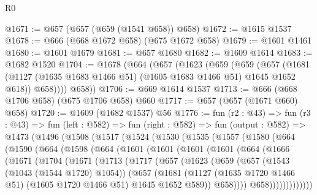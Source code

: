 \begin{lexlean}{R0}
\begin{coremodule}
@1671 := @657 (@657 (@659 (@1541 @658)) @658)
@1672 := @1615 @1537
@1678 := @666 (@668 @1672 @658) (@675 @1672 @658)
@1679 := @1601 @1461
@1680 := @1601 @1679
@1681 := @657 @1680
@1682 := @1609 @1614
@1683 := @1682 @1520
@1704 := @1678
    (@664
      (@657
        (@1623
          (@659
            (@659
              (@657
                (@1681 (@1127 (@1635 @1683 @1466 @51) (@1605 @1683 @1466 @51) @1645 @1652 @618))
                @658))))
        @658))
@1706 := @669 @1614 @1537
@1713 := @666 (@668 @1706 @658) (@675 @1706 @658) @660
@1717 := @657 (@657 (@1671 @660) @658)
@1720 := @1609 (@1682 @1537) @56
@1776 := fun (r2 : @43) =>
  fun (r3 : @43) =>
  fun (left : @582) =>
  fun (right : @582) =>
  fun (output : @582) =>
  @1473
    (@1496
      (@1508
        (@1517
          (@1524
            (@1530
              (@1535
                (@1557
                  (@1580
                    (@664
                      (@1590
                        (@664
                          (@1598
                            (@664
                              (@1601
                                (@1601
                                  (@1601
                                    (@1601
                                      (@664
                                        (@1666
                                          (@1671
                                            (@1704
                                              (@1671
                                                (@1713
                                                  (@1717
                                                    (@657
                                                      (@1623
                                                        (@659
                                                          (@657
                                                            (@1543 (@1043 (@1544 @1720) @1054))
                                                            (@657
                                                              (@1681
                                                                (@1127
                                                                  (@1635 @1720 @1466 @51)
                                                                  (@1605 @1720 @1466 @51)
                                                                  @1645
                                                                  @1652
                                                                  @589))
                                                              @658))))
                                                      @658)))))))))))))

\end{coremodule}
\end{lexlean}
